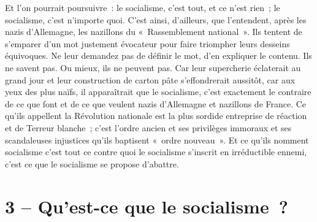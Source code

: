 \documentclass[french,twoside]{book} %
\newcommand\chapteropen{} %
\newcommand\chapterclose{} %
\begin{document}
Et l’on pourrait poursuivre : le socialisme, c’est tout, et ce n’est rien ; le socialisme, c’est n’importe quoi. C’est ainsi, d’ailleurs, que l’entendent, après les nazis d’Allemagne, les nazillons du « Rassemblement national ». Ils tentent de s’emparer d’un mot justement évocateur pour faire triompher leurs desseins équivoques. Ne leur demandez pas de définir   le mot, d’en expliquer le contenu. Ils ne savent pas. Ou mieux, ils ne peuvent pas. Car leur supercherie éclaterait au grand jour et leur construction de carton pâte s’effondrerait aussitôt, car aux yeux des plus naïfs, il apparaîtrait que le socialisme, c’est exactement le contraire de ce que font et de ce que veulent nazis d’Allemagne et nazillons de France. Ce qu’ils appellent la Révolution nationale est la plus sordide entreprise de réaction et de Terreur blanche ; c’est l’ordre ancien et ses privilèges immoraux et ses scandaleuses injustices qu’ils baptisent « ordre nouveau ». Et ce qu’ils nomment socialisme c’est tout ce contre quoi le socialisme s’inscrit en irréductible ennemi, c’est ce que le socialisme se propose d’abattre.
\chapterclose


\chapteropen
\chapter[3 – Qu’est-ce que le socialisme ?]{3 – Qu’est-ce que le socialisme ?}\renewcommand{\leftmark}{3 – Qu’est-ce que le socialisme ?}
\end{document}
